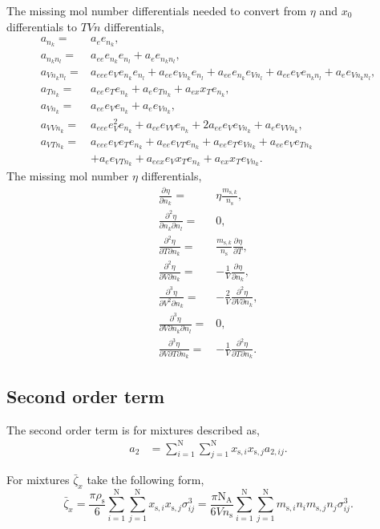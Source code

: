 \documentclass[english]{../thermomemo/thermomemo}
\newcommand*{\pd}[3][]{\frac{\partial^{#1}#2}{\partial{#3}^{#1}}}%
\newcommand*{\pdc}[3]{\frac{\partial^{2}#1}{\partial{#2}\partial{#3}}}%
\newcommand*{\pdcc}[3]{\frac{\partial^{3}#1}{\partial{#2}^{2}\partial{#3}}}%
\newcommand*{\pdth}[4]{\frac{\partial^{3}#1}{\partial{#2}\partial{#3}\partial{#4}}}%
\newcommand{\seg}{\ensuremath{\text{s}}\xspace}
\newcommand{\zb}{\bar{\zeta}}
\newcommand{\nc}{\ensuremath{\text{N}}\xspace}
\newcommand{\NA}{\ensuremath{\text{N}_{\text{A}}}\xspace}
\begin{document}
The missing mol number differentials needed to convert from $\eta$ and
$x_0$ differentials to $TVn$ differentials,
\begin{align}
  a_{n_k} =& a_{e} e_{n_k},\\
  a_{n_k n_l} =& a_{ee} e_{n_k}e_{n_l} + a_{e} e_{n_k n_l},\\
  a_{V n_k n_l} =& a_{eee} e_{V}e_{n_k}e_{n_l} + a_{ee} e_{V n_k}e_{n_l} + a_{ee} e_{n_k}e_{V n_l} + a_{ee} e_{V} e_{n_k n_l} + a_{e} e_{V n_k n_l},\\
  a_{T n_k} =& a_{ee} e_{T}e_{n_k} + a_{e} e_{T n_k} + a_{ex} x_T e_{n_k},\\
  a_{V n_k} =& a_{ee} e_{V}e_{n_k} + a_{e} e_{V n_k},\\
  a_{V V n_k} =& a_{eee} e_{V}^2 e_{n_k} + a_{ee} e_{VV} e_{n_k} + 2 a_{ee} e_{V} e_{V n_k} + a_{e} e_{V V n_k},\\
  a_{V T n_k} =& a_{eee} e_{V}e_{T}e_{n_k} + a_{ee} e_{VT}e_{n_k} + a_{ee} e_{T}e_{Vn_k} + a_{ee} e_{V}e_{T n_k} \nonumber \\ &+ a_{e} e_{V T n_k} + a_{eex} e_{V} x_T e_{n_k} + a_{ex} x_T e_{V n_k} .
\end{align}
The missing mol number $\eta$ differentials,
\begin{align}
  \pd{\eta}{n_k} =& \eta \frac{m_{\seg,k}}{n_\seg},\\
  \pdc{\eta}{n_k}{n_l} =& 0,\\
  \pdc{\eta}{T}{n_k} =& \frac{m_{\seg,k}}{n_\seg}\pd{\eta}{T},\\
  \pdc{\eta}{V}{n_k} =& -\frac{1}{V} \pd{\eta}{n_k}, \\
  \pdcc{\eta}{V}{n_k} =& -\frac{2}{V} \pdc{\eta}{V}{n_k}, \\
  \pdth{\eta}{V}{n_k}{n_l} =& 0, \\
  \pdth{\eta}{V}{T}{n_k} =& -\frac{1}{V} \pdc{\eta}{T}{n_k}.
\end{align}
\subsection{Second order term}
The second order term is for mixtures described as,
\begin{align}
  \label{eq:a_2_mix}
  a_2 &=  \sum_{i=1}^\nc\sum_{j=1}^\nc x_{\seg,i}x_{\seg,j} a_{2,ij}.
\end{align}

For mixtures $\zb_x$ take the following form,
\begin{equation}
  \label{eq:zxb_mix}
  \zb_x = \frac{\pi\rho_\seg}{6} \sum_{i=1}^\nc \sum_{j=1}^\nc x_{\seg,i}x_{\seg,j} \sigma_{ij}^3 = \frac{\pi\NA}{6 V n_\seg} \sum_{i=1}^\nc \sum_{j=1}^\nc m_{\seg,i} n_i m_{\seg,j} n_j \sigma_{ij}^3.
\end{equation}
\end{document}

